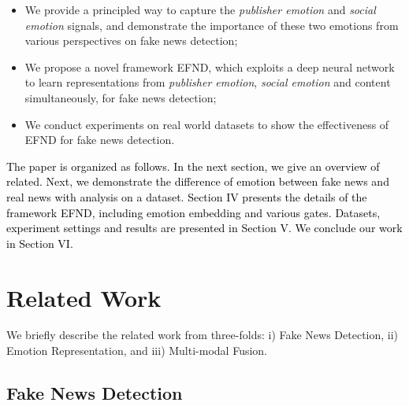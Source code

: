\documentclass[conference]{IEEEtran}
\newcommand{\m}{EFND}
\newcommand{\new}[1]{\textcolor{black}{{#1}}}
\begin{document}
	\begin{itemize}
		
		\item We provide a principled way to capture the {\em publisher emotion} and {\em social emotion} signals, and demonstrate the importance of these two emotions from various perspectives on fake news detection;
		\item We propose a novel framework {\m}, which exploits a deep neural network to learn representations from {\em publisher emotion}, {\em social emotion} and content simultaneously, for fake news detection;
		\item We conduct experiments on real world datasets to show the effectiveness of {\m} for fake news detection. 
	\end{itemize}
	
	\new{The paper is organized as follows. In the next section, we give an overview of related. Next, we demonstrate the difference of emotion between fake news and real news with analysis on a dataset. Section IV presents the details of the framework {\m}, including emotion embedding and various gates. Datasets, experiment settings and results are presented in Section V. We conclude our work in Section VI.}
	
	\section{Related Work}
	
	We briefly describe the related work from three-folds: i) Fake News Detection, ii) Emotion Representation, and iii) Multi-modal Fusion.
	
	\subsection{Fake News Detection}
	
\end{document}

